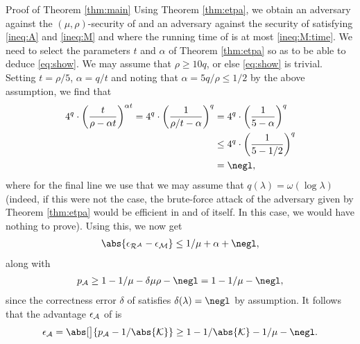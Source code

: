 \begin{namedproof}{Proof of Theorem \ref{thm:main}}
  Using Theorem \ref{thm:etpa},
  we obtain an adversary \advA against the \((\mu,\rho)\)-\ETPA security of \TP
  and an adversary \redM against the \SICA security of \Simple
  satisfying \eqref{ineq:A} and \eqref{ineq:M}
  and where the running time of \redM is at most \eqref{ineq:M:time}.
  We need to select the parameters \(t\) and \(\alpha\) of Theorem \ref{thm:etpa}
  so as to be able to deduce \eqref{eq:show}.
  We may assume that \(\rho \ge 10 q\), or else \eqref{eq:show} is trivial.
  Setting \(t = \rho / 5\), \(\alpha = q/t\) and noting that
  \(\alpha =  5 q / \rho \le 1/2\) by the above assumption, we find that
  \begin{align}
    4^{q} \cdot \left( \frac{t}{\rho - \alpha t} \right)^{\alpha t}
    = 4^{q} \cdot \left( \frac{1}{\rho / t - \alpha} \right)^{q}
    & = 4^{q} \cdot \left( \frac{1}{5 - \alpha} \right)^{q} \notag\\
    & \le 4^{q} \cdot \left( \frac{1}{5 - 1/2} \right)^{q} \notag\\
    & = \negl, \notag
  \end{align}
  where for the final line we use that we may assume that
  \(q(\lambda) = \omega(\log{\lambda})\)
  (indeed, if this were not the case, the brute-force attack of the adversary \advA
  given by Theorem \ref{thm:etpa}
  would be efficient in and of itself. In this case, we would have nothing to prove).
  Using this, we now get
  \begin{align}\label{ineq:eps}
    \abs{\epsilon_{\redR^{\advA}} - \epsilon_{\redM}} \le 1/\mu + \alpha + \negl,
  \end{align}
  along with
  \begin{align}
    p_{\advA} \ge 1 - 1/\mu - \delta \mu \rho - \negl
    = 1 - 1/\mu - \negl,
  \end{align}
  since the correctness error \(\delta\) of \TP satisfies \(\delta(\lambda) = \negl\) by assumption.
  It follows that the advantage \(\epsilon_{\mathcal{A}}\) of \advA is
  \[
  \epsilon_{\advA} = \abs[\big]{p_{\advA} - 1/\abs{\keyspace}} \ge 1 - 1/\abs{\keyspace} - 1/\mu - \negl.
  \]


\end{namedproof}

